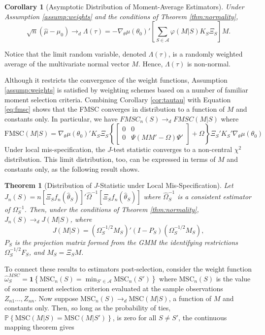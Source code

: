 \documentclass[12pt]{article}
\newcommand{\p}{\mathbb{P}}
\newtheorem{thm}{Theorem}[section]
\newtheorem{cor}{Corollary}[section]
\theoremstyle{definition}
\begin{document}
\begin{cor}[Asymptotic Distribution of Moment-Average Estimators]
\label{cor:momentavg}
Under Assumption \ref{assump:weights} and the conditions of Theorem \ref{thm:normality},
	$$\sqrt{n}\left(\widehat{\mu} -  \mu_0\right) \rightarrow_{d}\Lambda(\tau) =  -\nabla_\theta\mu(\theta_0)'\left[\sum_{S \in \mathcal{A}} \varphi(M|S) K_S\Xi_S\right] M.$$
\end{cor}
Notice that the limit random variable, denoted $\Lambda(\tau)$, is a randomly weighted average of the multivariate normal vector $M$. Hence, $\Lambda(\tau)$ is non-normal. 

Although it restricts the convergence of the weight functions, Assumption \ref{assump:weights} is satisfied by weighting schemes based on a number of familiar moment selection criteria. Combining Corollary \ref{cor:tautau} with Equation \ref{eq:fmsc} shows that the FMSC converges in distribution to a function of $M$ and constants only. In particular, we have $FMSC_n(S) \rightarrow_dFMSC(M|S)$ where
\begin{equation}
\label{eq:FMSClimit}
	\mbox{FMSC}(M|S) = \nabla_\theta\mu(\theta_0)'K_S\Xi_S \left\{\left[\begin{array}{cc}0&0\\0&\Psi \left(MM' - \Omega\right)\Psi' \end{array}\right] + \Omega\right\}\Xi_S'K_S'\nabla_\theta\mu(\theta_0)
\end{equation}
Under local mis-specification, the $J$-test statistic converges to a non-central $\chi^2$ distribution. This limit distribution, too, can be expressed in terms of $M$ and constants only, as the following result shows.
\begin{thm}[Distribution of $J$-Statistic under Local Mis-Specification] 
\label{pro:jstat}
	Let $J_n(S)  = n \left[\Xi_S f_n(\widehat{\theta}_S)\right]' \widehat{\Omega}^{-1}\left[\Xi_S f_n(\widehat{\theta}_S)\right]$ where $\widehat{\Omega}^{-1}_S$ is a consistent estimator of $\Omega_S^{-1}$. Then, under the conditions of Theorem \ref{thm:normality}, $J_n(S) \rightarrow_dJ(M|S)$, where
		$$J(M|S)=(\Omega_S^{-1/2}M_S)' (I - P_S)(\Omega_S^{-1/2}M_S),$$
$P_S$ is the projection matrix formed from the GMM the identifying restrictions $\Omega^{-1/2}_S F_S$, and $M_S = \Xi_S M$.
\end{thm}
To connect these results to estimators post-selection, consider the weight function $\widehat{\omega}_S^{MSC} = \mathbf{1}\left\{\mbox{MSC}_n(S) = \min_{S'\in \mathcal{A}} \mbox{MSC}_n(S')\right\}$ where $\mbox{MSC}_n(S)$ is the value of some moment selection criterion evaluated at the sample observations $Z_{n1}\hdots, Z_{nn}$. Now suppose $\mbox{MSC}_n(S) \rightarrow_d\mbox{MSC}(M|S)$, a function of $M$ and constants only. Then, so long as the probability of ties, $\p\left\{\mbox{MSC}(M|S) = \mbox{MSC}(M|S') \right\}$, is zero for all $S\neq S'$, the continuous mapping theorem gives 
\end{document}
